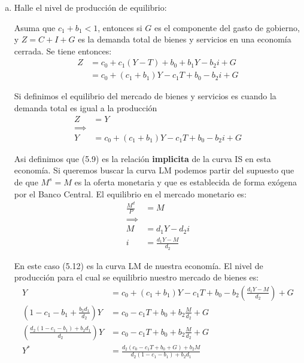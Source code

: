 \begin{enumerate}[(a)]
    \item Halle el nivel de producción de equilibrio:

Asuma que $c_{1}+b_{1}<1$, entonces si $G$ es el componente del gasto de gobierno, y $Z=C+I+G$ es la demanda total de bienes y servicios en una economía cerrada. Se tiene entonces:
\begin{align}
    Z & = c_{0}+c_{1}(Y-T)+ b_{0}+b_{1}Y -b_{2}i+G\\
    & =  c_{0}+(c_{1}+b_{1})Y-c_{1}T+ b_{0} -b_{2}i+G
\end{align}
    
Si definimos el equilibrio del mercado de bienes y servicios es cuando la demanda total es igual a la producción
\begin{align}
    Z &= Y\\
    \implies & \nonumber \\
    Y &= c_{0}+(c_{1}+b_{1})Y-c_{1}T+ b_{0} -b_{2}i+G
\end{align}

Asi definimos que (5.9) es la relación \textbf{implicita} de la curva IS en esta economía. Si queremos buscar la curva LM podemos partir del supuesto que de que $M^{s}=M$ es la oferta monetaria y que es establecida de forma exógena por el Banco Central. El equilibrio en el mercado monetario es:
\begin{align}
    \frac{M^{d}}{P} &= M\\
    \implies & \nonumber \\
    M &= d_{1}Y-d_{2}i\\
    i & = \frac{d_{1}Y-M}{d_{2}}
\end{align}

En este caso (5.12) es la curva LM de nuestra economía. El nivel de producción para el cual se equilibrio nuestro mercado de bienes es:
\begin{align}
    Y &= c_{0}+(c_{1}+b_{1})Y-c_{1}T+ b_{0} -b_{2}\left(\frac{d_{1}Y-M}{d_{2}}\right)+G\\
    \left(1-c_{1}-b_{1}+\frac{b_{2}d_{1}}{d_{2}}\right)Y &
    = c_{0}-c_{1}T+ b_{0} +b_{2}\frac{M}{d_{2}}+G\\
    \left(\frac{d_{2}(1-c_{1}-b_{1})+b_{2}d_{1}}{d_{2}}\right)Y &
    = c_{0}-c_{1}T+ b_{0} +b_{2}\frac{M}{d_{2}}+G\\
    Y^{*} & = \frac{d_{2}(c_{0}-c_{1}T+ b_{0}+G) +b_{2}M}{d_{2}(1-c_{1}-b_{1})+b_{2}d_{1}}
\end{align}


\end{enumerate}
